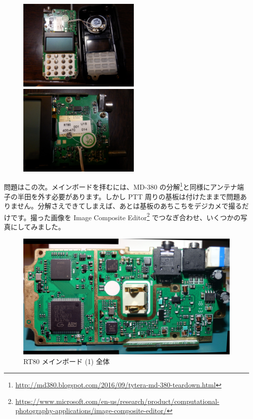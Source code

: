 \documentclass[a4j,oneside]{ujbook}
\begin{document}
\begin{figure}[H]
 \begin{minipage}[t]{0.5\hsize}
  \centering
  \includegraphics[width=6cm]{img/pa133670.jpg}
  \caption{}
 \end{minipage}
 \begin{minipage}[t]{0.5\hsize}
  \centering
  \includegraphics[width=6cm]{img/pa133671.jpg}
  \caption{}
 \end{minipage}
\end{figure}

問題はこの次。メインボードを拝むには、MD-380 の分解\footnote{\url{http://md380.blogspot.com/2016/09/tytera-md-380-teardown.html}}と同様にアンテナ端子の半田を外す必要があります。しかし PTT 周りの基板は付けたままで問題ありません。分解さえできてしまえば、あとは基板のあちこちをデジカメで撮るだけです。撮った画像を Image Composite Editor\footnote{\url{https://www.microsoft.com/en-us/research/product/computational-photography-applications/image-composite-editor/}} でつなぎ合わせ、いくつかの写真にしてみました。

\begin{figure}[H]
 \centering
 \includegraphics[width=15cm]{img/pa163690_stitch.jpg}
 \caption{RT80 メインボード (1) 全体}
\end{figure}
\end{document}
